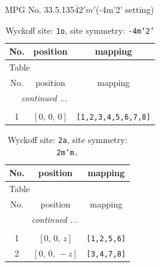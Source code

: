 \documentclass[fleqn,8pt]{jsarticle}
\begin{document}
\setcounter{MaxMatrixCols}{32}

\renewcommand{\tablename}{Table~}
\renewcommand{\figurename}{Figure~}
\begin{center}
\LARGE
MPG No. 33.5.135\quad$\bar{4}2'm'$\quad(-4m'2' setting)
\end{center}
\renewcommand{\arraystretch}{1.2}
\begin{longtable}{ccc}
\caption{Wyckoff site: {\tt 1o}, site symmetry: {\tt -4m'2'}}
 \\
 \hline \hline
No. & position & mapping \\ \hline \endfirsthead

\multicolumn{2}{l}{\tablename\ \thetable{}} \\
 \hline \hline
No. & position & mapping \\ \hline \endhead

 \hline \hline
\multicolumn{2}{r}{\footnotesize\it continued ...} \\ \endfoot

 \hline \hline
\multicolumn{2}{r}{} \\ \endlastfoot

1 & $\left[ 0,\, 0,\, 0 \right]$ & {\tt [1,2,3,4,5,6,7,8]} \\
\end{longtable}
\renewcommand{\arraystretch}{1.2}
\begin{longtable}{ccc}
\caption{Wyckoff site: {\tt 2a}, site symmetry: {\tt 2m'm.}}
 \\
 \hline \hline
No. & position & mapping \\ \hline \endfirsthead

\multicolumn{2}{l}{\tablename\ \thetable{}} \\
 \hline \hline
No. & position & mapping \\ \hline \endhead

 \hline \hline
\multicolumn{2}{r}{\footnotesize\it continued ...} \\ \endfoot

 \hline \hline
\multicolumn{2}{r}{} \\ \endlastfoot

1 & $\left[ 0,\, 0,\, z \right]$ & {\tt [1,2,5,6]} \\ \hline
2 & $\left[ 0,\, 0,\, - z \right]$ & {\tt [3,4,7,8]} \\
\end{longtable}
\renewcommand{\arraystretch}{1.2}
\end{document}
